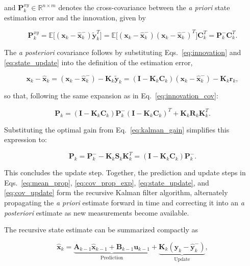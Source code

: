 and $\bm{P}_k^{xy} \in \mathbb{R}^{n \times m}$ denotes the cross-covariance between the \emph{a priori} state estimation error and the innovation, given by

\begin{equation}
	\bm{P}_k^{xy} 
	= 
	\mathbb{E}\big[(\bm{x}_k - \hat{\bm{x}}_k^-)\tilde{\bm{y}}_k^T\big]
	=
	\mathbb{E}\big[(\bm{x}_k-\hat{\bm{x}}_k^-)(\bm{x}_k-\hat{\bm{x}}_k^-)^T\big]\bm{C}_k^T
	=
	\bm{P}_k^- \bm{C}_k^T.
	\label{eq:cross_cov}
\end{equation}

The \emph{a posteriori} covariance follows by substituting Eqs.~\eqref{eq:innovation} and \eqref{eq:state_update} into the definition of the estimation error,

\begin{equation}
	\bm{x}_k - \hat{\bm{x}}_k 
	= 
	(\bm{x}_k - \hat{\bm{x}}_k^-) - \bm{K}_k \tilde{\bm{y}}_k
	=
	(\bm{I} - \bm{K}_k \bm{C}_k)(\bm{x}_k - \hat{\bm{x}}_k^-) - \bm{K}_k \bm{r}_k,
	\label{eq:posterior_error}
\end{equation}

so that, following the same expansion as in Eq.~\eqref{eq:innovation_cov}:

\begin{equation}
	\bm{P}_k 
	= 
	(\bm{I} - \bm{K}_k \bm{C}_k)\bm{P}_k^-(\bm{I} - \bm{K}_k \bm{C}_k)^T + \bm{K}_k \bm{R}_k \bm{K}_k^T.
	\label{eq:cov_update_joseph}
\end{equation}

Substituting the optimal gain from Eq.~\eqref{eq:kalman_gain} simplifies this expression to:

\begin{equation}
	\bm{P}_k = \bm{P}_k^- - \bm{K}_k \bm{S}_k \bm{K}_k^T = (\bm{I} - \bm{K}_k \bm{C}_k)\bm{P}_k^-.
	\label{eq:cov_update}
\end{equation}

This concludes the update step. Together, the prediction and update steps in Eqs.~\eqref{eq:mean_prop}, \eqref{eq:cov_prop_exp}, \eqref{eq:state_update}, and \eqref{eq:cov_update} form the recursive Kalman filter algorithm, alternately propagating the \emph{a priori} estimate forward in time and correcting it into an \emph{a posteriori} estimate as new measurements become available.

The recursive state estimate can be summarized compactly as

\begin{equation}
	\hat{\bm{x}}_{k}
	=
	\underbrace{\bm{A}_{k-1}\hat{\bm{x}}_{k-1} + \bm{B}_{k-1}\bm{u}_{k-1}}
	_{\text{Prediction}}
	+
	\underbrace{\bm{K}_k\left(\bm{y}_k - \hat{\bm{y}}_k^-\right)}
	_{\text{Update}},
\end{equation}

